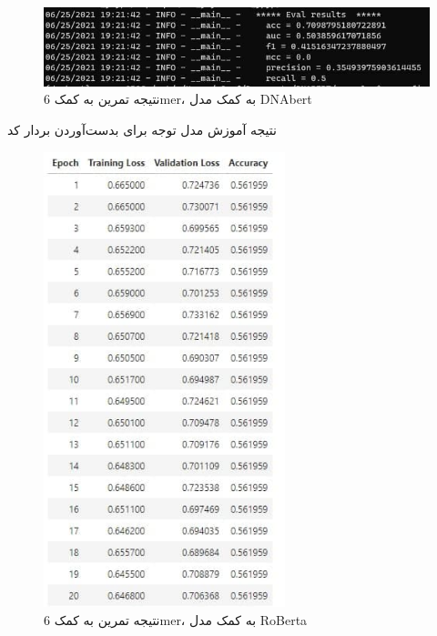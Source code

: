 \documentclass[12pt,a4paper,BCOR=.7cm,headsepline,bibliography=totoc]{report}
\begin{document}
\begin{figure}[H]
\centering
\includegraphics[width=15cm, ]{pictures/6mer.jpg}
\caption{
نتیجه تمرین به کمک 6mer، به کمک مدل DNAbert
}\label{wrap-fig:4}
\end{figure}
نتیجه آموزش مدل توجه برای بدست‌آوردن بردار کد
\begin{figure}[H]
\centering
\includegraphics[width=7cm, ]{pictures/crisprBert.jpg}
\caption{
نتیجه تمرین به کمک 6mer، به کمک مدل RoBerta
}\label{wrap-fig:4}
\end{figure}
\end{document}
